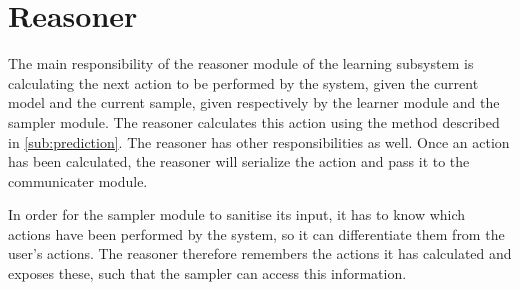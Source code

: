 \section{Reasoner}\label{sec:Reasoner}
The main responsibility of the reasoner module of the learning subsystem is calculating the next action to be performed by the system, given the current model and the current sample, given respectively by the learner module and the sampler module.
The reasoner calculates this action using the method described in \cref{sub:prediction}.
The reasoner has other responsibilities as well. Once an action has been calculated, the reasoner will serialize the action and pass it to the communicater module.

In order for the sampler module to sanitise its input, it has to know which actions have been performed by the system, so it can differentiate them from the user's actions. The reasoner therefore remembers the actions it has calculated and exposes these, such that the sampler can access this information.
